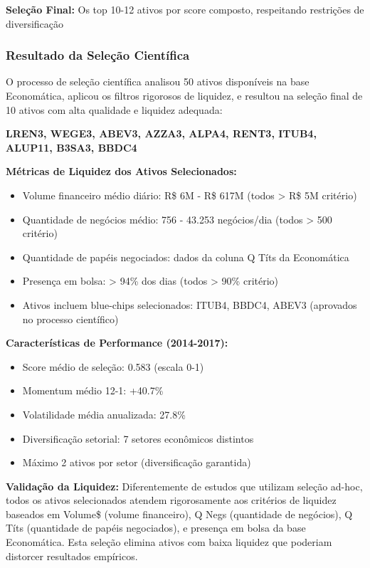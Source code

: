 \textbf{Seleção Final:} Os top 10-12 ativos por score composto, respeitando restrições de diversificação

\subsubsection{Resultado da Seleção Científica}

O processo de seleção científica analisou 50 ativos disponíveis na base Economática, aplicou os filtros rigorosos de liquidez, e resultou na seleção final de 10 ativos com alta qualidade e liquidez adequada:

\begin{center}
\textbf{LREN3, WEGE3, ABEV3, AZZA3, ALPA4, RENT3, ITUB4, ALUP11, B3SA3, BBDC4}
\end{center}

\textbf{Métricas de Liquidez dos Ativos Selecionados:}
\begin{itemize}
    \item Volume financeiro médio diário: R\$ 6M - R\$ 617M (todos > R\$ 5M critério)
    \item Quantidade de negócios médio: 756 - 43.253 negócios/dia (todos > 500 critério)
    \item Quantidade de papéis negociados: dados da coluna Q Títs da Economática
    \item Presença em bolsa: > 94\% dos dias (todos > 90\% critério)
    \item Ativos incluem blue-chips selecionados: ITUB4, BBDC4, ABEV3 (aprovados no processo científico)
\end{itemize}

\textbf{Características de Performance (2014-2017):}
\begin{itemize}
    \item Score médio de seleção: 0.583 (escala 0-1)
    \item Momentum médio 12-1: +40.7\%
    \item Volatilidade média anualizada: 27.8\%
    \item Diversificação setorial: 7 setores econômicos distintos
    \item Máximo 2 ativos por setor (diversificação garantida)
\end{itemize}

\textbf{Validação da Liquidez:} Diferentemente de estudos que utilizam seleção ad-hoc, todos os ativos selecionados atendem rigorosamente aos critérios de liquidez baseados em Volume\$ (volume financeiro), Q Negs (quantidade de negócios), Q Títs (quantidade de papéis negociados), e presença em bolsa da base Economática. Esta seleção elimina ativos com baixa liquidez que poderiam distorcer resultados empíricos.

